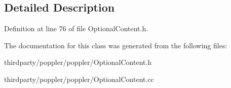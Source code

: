 \subsection{Detailed Description}


Definition at line 76 of file Optional\+Content.\+h.



The documentation for this class was generated from the following files\+:\begin{DoxyCompactItemize}
\item 
thirdparty/poppler/poppler/Optional\+Content.\+h\item 
thirdparty/poppler/poppler/Optional\+Content.\+cc\end{DoxyCompactItemize}
